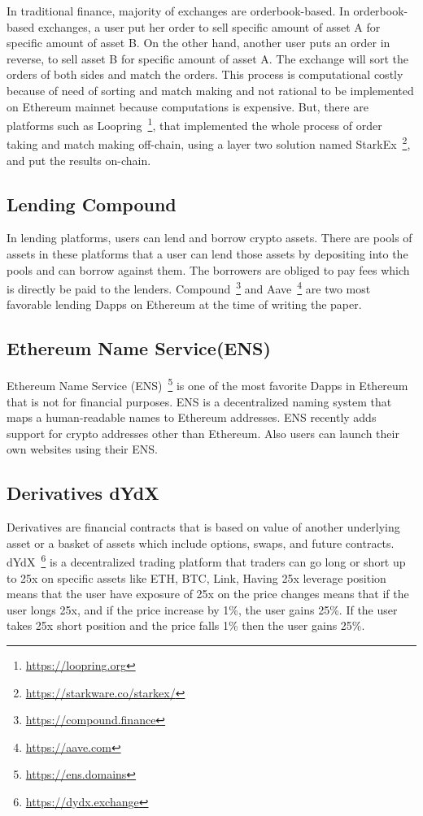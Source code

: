 In traditional finance, majority of exchanges are orderbook-based. In orderbook-based exchanges, a user put her order to sell specific amount of asset A for specific amount of asset B. On the other hand, another user puts an order in reverse, to sell asset B for specific amount of asset A. The exchange will sort the orders of both sides and match the orders. This process is computational costly because of need of sorting and match making and not rational to be implemented on Ethereum mainnet because computations is expensive. But, there are platforms such as Loopring~\footnote{\url{https://loopring.org}}, that implemented the whole process of order taking and match making off-chain, using a layer two solution named StarkEx~\footnote{\url{https://starkware.co/starkex/}}, and put the results on-chain.

\subsection{Lending \eg Compound}
In lending platforms, users can lend and borrow crypto assets. There are pools of assets in these platforms that a user can lend those assets by depositing into the pools and can borrow against them. The borrowers are obliged to pay fees which is directly be paid to the lenders. Compound~\footnote{\url{https://compound.finance}} and Aave~\footnote{\url{https://aave.com}} are two most favorable lending Dapps on Ethereum at the time of writing the paper. 

\subsection{Ethereum Name Service(ENS)}
Ethereum Name Service (ENS)~\footnote{\url{https://ens.domains}} is one of the most favorite Dapps in Ethereum that is not for financial purposes. ENS is a decentralized naming system that maps a human-readable names to Ethereum addresses. 
ENS recently adds support for crypto addresses other than Ethereum. Also users can launch their own websites using their ENS.

\subsection{Derivatives \eg dYdX}
Derivatives are financial contracts that is based on value of another underlying asset or a basket of assets which include options, swaps, and future contracts. dYdX~\footnote{\url{https://dydx.exchange}} is a decentralized trading platform that traders can go long or short up to 25x on specific assets like ETH, BTC, Link, \etc
Having 25x leverage position means that the user have exposure of 25x on the price changes means that if the user longs 25x, and if the price increase by 1\%, the user gains 25\%. If the user takes 25x short position and the price falls 1\% then the user gains 25\%.

